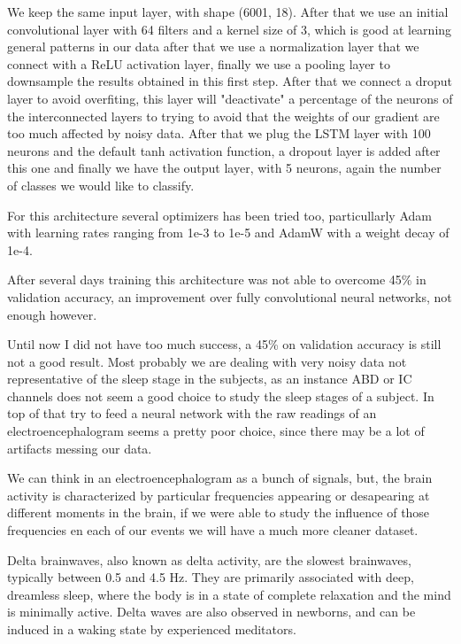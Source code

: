 We keep the same input layer, with shape (6001, 18). After that we use an initial convolutional layer with 64 filters and a kernel size of 3, which is good at learning general patterns in our data after that we use a normalization layer that we connect with a ReLU activation layer, finally we use a pooling layer to downsample the results obtained in this first step. After that we connect a droput layer to avoid overfiting, this layer will "deactivate" a percentage of the neurons of the interconnected layers to trying to avoid that the weights of our gradient are too much affected by noisy data. After that we plug the LSTM layer with 100 neurons and the default tanh activation function, a dropout layer is added after this one and finally we have the output layer, with 5 neurons, again the number of classes we would like to classify.

For this architecture several optimizers has been tried too, particullarly Adam with learning rates ranging from 1e-3 to 1e-5 and AdamW with a weight decay of 1e-4.

After several days training this architecture was not able to overcome 45\% in validation accuracy, an improvement over fully convolutional neural networks, not enough however.

Until now I did not have too much success, a 45\% on validation accuracy is still not a good result. Most probably we are dealing with very noisy data not representative of the sleep stage in the subjects, as an instance ABD or IC channels does not seem a good choice to study the sleep stages of a subject. In top of that try to feed a neural network with the raw readings of an electroencephalogram seems a pretty poor choice, since there may be a lot of artifacts messing our data.

We can think in an electroencephalogram as a bunch of signals, but, the brain activity is characterized by particular frequencies appearing or desapearing at different moments in the brain, if we were able to study the influence of those frequencies en each of our events we will have a much more cleaner dataset.

Delta brainwaves, also known as delta activity, are the slowest brainwaves, typically between 0.5 and 4.5 Hz. They are primarily associated with deep, dreamless sleep, where the body is in a state of complete relaxation and the mind is minimally active. Delta waves are also observed in newborns, and can be induced in a waking state by experienced meditators.

